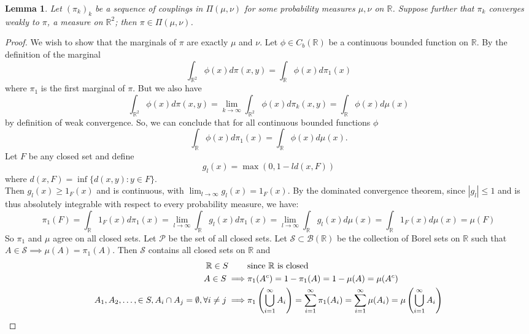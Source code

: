 \documentclass[11pt]{amsart}
\newtheorem{lemma}[theorem]{Lemma}         %
\theoremstyle{definition}                  %
\theoremstyle{remark}                      %
\begin{document}
\begin{lemma}\label{lemma:limit_coupling}
    Let $(\pi_k)_k$ be a sequence of couplings in $\Pi(\mu,\nu)$ for some probability measures $\mu,\nu$ on $ \mathbb{R}$.
    Suppose further that $\pi_k$ converges weakly to $\pi$, a measure on $ \mathbb{R}^2$; then $\pi \in \Pi( \mu, \nu)$.
\end{lemma}
\begin{proof}
    We wish to show that the marginals of $\pi$ are exactly $\mu$ and $\nu$.
    Let $\phi \in C_b( \mathbb{R})$ be a continuous bounded function on $ \mathbb{R}$.
    By the definition of the marginal
    \[
    \int_{ \mathbb{R}^2}^{} \phi(x) d\pi(x,y) =  \int_{ \mathbb{R}}^{}\phi(x) d\pi_1(x)
    \] 
    where $\pi_1$ is the first marginal of $\pi$.
    But we also have
    \[
    \int_{ \mathbb{R}^2}^{}\phi(x)d\pi(x,y) = \lim_{k\to \infty} \int_{ \mathbb{R}^2}^{}\phi(x)d\pi_k(x,y) = \int_{ \mathbb{R}}^{}\phi(x)d\mu(x)
    \] 
    by definition of weak convergence.
    So, we can conclude that for all continuous bounded functions $\phi$
    \[
    \int_{ \mathbb{R}}^{}\phi(x)d\pi_1(x) = \int_{ \mathbb{R}}^{}\phi(x) d\mu(x).
    \] 
    Let $F$ be any closed set and define
    \[
    g_l(x) = \max(0,1 - ld(x,F))
    \] 
    where $d(x,F) = \inf\{d(x,y) : y \in F\}$. \\
    Then $g_l(x) \ge 1_{F}(x)$ and is continuous, with $\lim_{l\to \infty}g_l(x) = 1_{F}(x)$. By the dominated convergence theorem, since $|g_l| \le 1$ and is thus absolutely integrable with respect to every probability measure, we have:
    \[
    \pi_1(F) = \int_{ \mathbb{R}}^{} 1_F(x) d\pi_1(x) = \lim_{l\to \infty} \int_{ \mathbb{R}}^{}g_l(x) d\pi_1(x) = \lim_{l\to \infty} \int_{ \mathbb{R}}^{}g_l(x) d\mu(x)  = \int_{ \mathbb{R}}^{}1_F(x) d\mu(x) = \mu(F)
    \] 
    So $\pi_1$ and $\mu$ agree on all closed sets.
    Let $ \mathcal{P}$ be the set of all closed sets.
    Let $\mathcal{S} \subset \mathcal{B}( \mathbb{R})$ be the collection of Borel sets on $ \mathbb{R}$ such that $A \in \mathcal{S} \implies \mu(A) = \pi_1(A)$.
    Then $\mathcal{S}$ contains all closed sets on  $ \mathbb{R}$ and
    \begin{align*}
        \mathbb{R} \in S \;\;\;\;\;\;\;\;&\text{since $ \mathbb{R}$ is closed}\\
        A \in S \implies& \pi_1(A^{c}) = 1 - \pi_1(A) = 1 - \mu(A) = \mu(A^{c})\\
        A_1, A_2, \dots, \in S, A_i \cap A_j = \emptyset, \forall i \ne j \implies& \pi_1 \left( \bigcup_{i=1}^{\infty}A_i \right) = \sum_{i=1}^{\infty}\pi_1(A_i) = \sum_{i=1}^{\infty}\mu(A_i) = \mu\left(\bigcup_{i=1}^{\infty}A_i\right)

\end{align*}
\end{proof}
\end{document}
